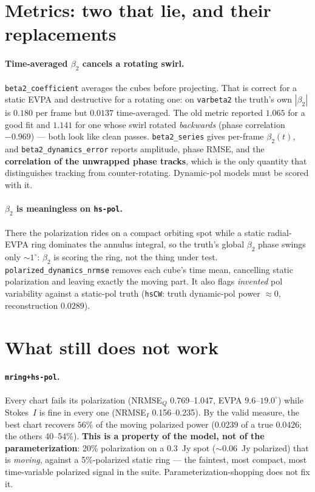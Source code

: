 \documentclass[11pt]{article}
\begin{document}
\section{Metrics: two that lie, and their replacements}
\label{sec:metrics}

\paragraph{Time-averaged $\beta_2$ cancels a rotating swirl.}
\texttt{beta2\_coefficient} averages the cubes before projecting. That is correct for a
static EVPA and destructive for a rotating one: on \texttt{varbeta2} the truth's own
$|\beta_2|$ is $0.180$ per frame but $0.0137$ time-averaged. The old metric reported
$1.065$ for a good fit and $1.141$ for one whose swirl rotated \emph{backwards}
(phase correlation $-0.969$) --- both look like clean passes. \texttt{beta2\_series}
gives per-frame $\beta_2(t)$, and \texttt{beta2\_dynamics\_error} reports amplitude,
phase RMSE, and the \textbf{correlation of the unwrapped phase tracks}, which is the
only quantity that distinguishes tracking from counter-rotating. Dynamic-pol models
must be scored with it.

\paragraph{$\beta_2$ is meaningless on \texttt{hs-pol}.} There the polarization rides
on a compact orbiting spot while a static radial-EVPA ring dominates the annulus
integral, so the truth's global $\beta_2$ phase swings only ${\sim}1^\circ$: $\beta_2$
is scoring the ring, not the thing under test. \texttt{polarized\_dynamics\_nrmse}
removes each cube's time mean, cancelling static polarization and leaving exactly the
moving part. It also flags \emph{invented} pol variability against a static-pol truth
(\texttt{hsCW}: truth dynamic-pol power ${\approx}0$, reconstruction $0.0289$).

\section{What still does not work}

\paragraph{\texttt{mring+hs-pol}.} Every chart fails its polarization
(NRMSE$_Q$ 0.769--1.047, EVPA $9.6$--$19.0^\circ$) while Stokes~$I$ is fine in every one
(NRMSE$_I$ 0.156--0.235). By the valid measure, the best chart recovers $56\%$ of the
moving polarized power ($0.0239$ of a true $0.0426$; the others 40--54\%).
\textbf{This is a property of the model, not of the parameterization}: 20\%
polarization on a $0.3$~Jy spot (${\sim}0.06$~Jy polarized) that is \emph{moving},
against a 5\%-polarized static ring --- the faintest, most compact, most time-variable
polarized signal in the suite. Parameterization-shopping does not fix it.
\end{document}
